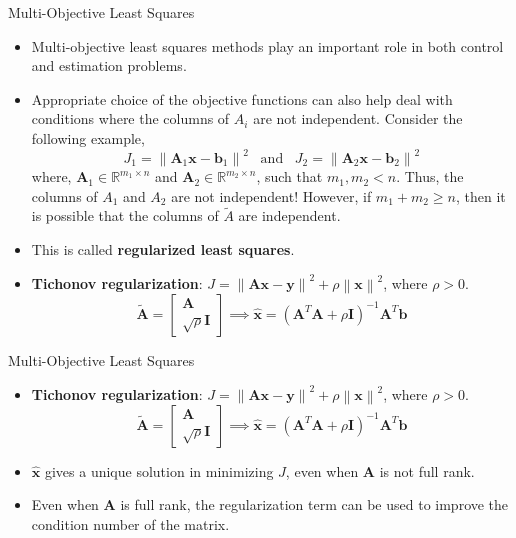 \documentclass[aspectratio=169]{beamer}
\begin{document}
\begin{frame}[t]{Multi-Objective Least Squares}
\begin{small}
\begin{itemize}
    \item Multi-objective least squares methods play an important role in both control and estimation problems.
    
    \item Appropriate choice of the objective functions can also help deal with conditions where the columns of $A_i$ are not independent. Consider the following example,
    \[ J_1 = \left\lVert \mathbf{A}_1\mathbf{x} - \mathbf{b}_1 \right\rVert^2 \,\,\, \text{ and } \,\,\, J_2 = \left\lVert \mathbf{A}_2\mathbf{x} - \mathbf{b}_2\right\rVert^2 \]
    where, $\mathbf{A}_1 \in \mathbb{R}^{m_1 \times n}$ and $\mathbf{A}_2 \in \mathbb{R}^{m_2 \times n}$, such that $m_1, m_2 < n$. Thus, the columns of $A_1$ and $A_2$ are not independent!
    However, if $m_1 + m_2 \geq n$, then it is possible that the columns of $\tilde{A}$ are independent.

    \item This is called \textbf{regularized least squares}.

    \item \textbf{Tichonov regularization}: $J = \left\lVert \mathbf{Ax} - \mathbf{y}\right\rVert^2 + \rho \left\lVert \mathbf{x} \right\rVert^2$, where $\rho > 0$.
    \[ \mathbf{\tilde{A}} = \begin{bmatrix*}\mathbf{A}\\\sqrt{\rho}\mathbf{I}\end{bmatrix*} \implies \hat{\mathbf{x}} =  \left(\mathbf{A}^T\mathbf{A} + \rho \mathbf{I}\right)^{-1}\mathbf{A}^T\mathbf{b} \]
\end{itemize}
\end{small}
\end{frame}


\begin{frame}[t]{Multi-Objective Least Squares}
\begin{small}
\begin{itemize}
    \item \textbf{Tichonov regularization}: $J = \left\lVert \mathbf{Ax} - \mathbf{y}\right\rVert^2 + \rho \left\lVert \mathbf{x} \right\rVert^2$, where $\rho > 0$.
    \[ \tilde{\mathbf{A}} = \begin{bmatrix*}\mathbf{A}\\\sqrt{\rho}\mathbf{I}\end{bmatrix*} \implies \hat{\mathbf{x}} =  \left(\mathbf{A}^T\mathbf{A} + \rho \mathbf{I}\right)^{-1}\mathbf{A}^T\mathbf{b} \]
    \item $\hat{\mathbf{x}}$ gives a unique solution in minimizing $J$, even when $\mathbf{A}$ is not full rank.
    \item Even when $\mathbf{A}$ is full rank, the regularization term can be used to improve the condition number of the matrix.
\end{itemize}
\end{small}
\end{frame}
\end{document}
